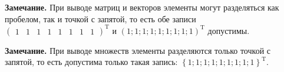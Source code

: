 \textbf{Замечание.} При выводе матриц и векторов элементы могут разделяться как пробелом, так и точкой с запятой, то есть обе записи $ {\left(\begin{array}{cccccccc}
 1&1&1&1&1&1&1&1
\end{array} \right)}^\mathrm{T} $ и $ {\left(1;1;1;1;1;1;1;1;1 \right)}^\mathrm{T} $ допустимы.

\textbf{Замечание.} При выводе множеств элементы разделяются только точкой с запятой, то есть допустима только такая запись: $ {\left\lbrace 1;1;1;1;1;1;1;1;1 \right\rbrace }^\mathrm{T} $.